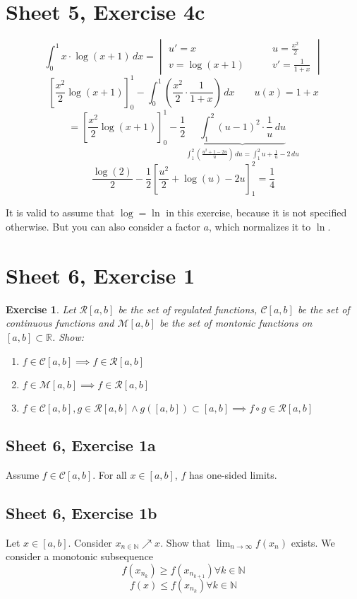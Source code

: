 \documentclass{article}
\newtheorem{ex}{Exercise} %
\begin{document}
\section{Sheet 5, Exercise 4c}

\[
  \int_0^1 x \cdot \log(x + 1) \, dx
    = \begin{vmatrix}
      u' = x  \qquad & u = \frac{x^2}{2}   \\
      v = \log(x+1) \qquad & v' = \frac1{1+x}
    \end{vmatrix}
\] \[
  \left[\frac{x^2}{2} \log(x+1)\right]_0^1 - \int_0^1 \left(\frac{x^2}2 \cdot \frac{1}{1+x}\right) \, dx \qquad u(x) = 1 + x
\] \[
  = \left[\frac{x^2}{2} \log(x+1)\right]_0^1 - \frac12 \underbrace{\int_1^2 (u - 1)^2 \cdot \frac1u \, du}_{\int_1^2 \left(\frac{u^2 + 1 - 2u}{u}\right) \, du = \int_1^2 u + \frac1u - 2 \, du}
\] \[
  \frac{\log(2)}{2} - \frac12 \left[\frac{u^2}{2} + \log(u) - 2u\right]_1^2 = \frac14
\]

It is valid to assume that $\log = \ln$ in this exercise, because it is not specified otherwise.
But you can also consider a factor $a$, which normalizes it to $\ln$.

\section{Sheet 6, Exercise 1}
\begin{ex}
  Let $\mathcal R[a,b]$ be the set of regulated functions, $\mathcal C[a,b]$ be the set of continuous functions
  and $\mathcal M[a,b]$ be the set of montonic functions on $[a,b] \subset \mathbb R$. Show:
  \begin{enumerate}
    \item $f \in \mathcal C[a,b] \implies f \in \mathcal R[a,b]$
    \item $f \in \mathcal M[a,b] \implies f \in \mathcal R[a,b]$
    \item $f \in \mathcal C[a,b], g \in \mathcal R[a,b] \land g([a,b]) \subset [a,b] \implies f \circ g \in \mathcal R[a,b]$
  \end{enumerate}
\end{ex}

\subsection{Sheet 6, Exercise 1a}
Assume $f \in \mathcal C[a,b]$.
For all $x \in [a,b]$, $f$ has one-sided limits.

\subsection{Sheet 6, Exercise 1b}
Let $x \in [a,b]$. Consider $x_{n \in \mathbb N} \nearrow x$.
Show that $\lim_{n\to\infty} f(x_n)$ exists.
We consider a monotonic subsequence
\[ f(x_{n_k}) \geq f(x_{n_{k+1}}) \forall k \in \mathbb N \]
\[ f(x) \leq f(x_{n_k}) \forall k \in \mathbb N \]
\end{document}
